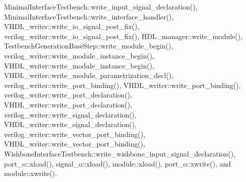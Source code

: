 Minimal\+Interface\+Testbench\+::write\+\_\+input\+\_\+signal\+\_\+declaration(), Minimal\+Interface\+Testbench\+::write\+\_\+interface\+\_\+handler(), V\+H\+D\+L\+\_\+writer\+::write\+\_\+io\+\_\+signal\+\_\+post\+\_\+fix(), verilog\+\_\+writer\+::write\+\_\+io\+\_\+signal\+\_\+post\+\_\+fix(), H\+D\+L\+\_\+manager\+::write\+\_\+module(), Testbench\+Generation\+Base\+Step\+::write\+\_\+module\+\_\+begin(), verilog\+\_\+writer\+::write\+\_\+module\+\_\+instance\+\_\+begin(), V\+H\+D\+L\+\_\+writer\+::write\+\_\+module\+\_\+instance\+\_\+begin(), V\+H\+D\+L\+\_\+writer\+::write\+\_\+module\+\_\+parametrization\+\_\+decl(), verilog\+\_\+writer\+::write\+\_\+port\+\_\+binding(), V\+H\+D\+L\+\_\+writer\+::write\+\_\+port\+\_\+binding(), verilog\+\_\+writer\+::write\+\_\+port\+\_\+declaration(), V\+H\+D\+L\+\_\+writer\+::write\+\_\+port\+\_\+declaration(), verilog\+\_\+writer\+::write\+\_\+signal\+\_\+declaration(), V\+H\+D\+L\+\_\+writer\+::write\+\_\+signal\+\_\+declaration(), verilog\+\_\+writer\+::write\+\_\+vector\+\_\+port\+\_\+binding(), V\+H\+D\+L\+\_\+writer\+::write\+\_\+vector\+\_\+port\+\_\+binding(), Wishbone\+Interface\+Testbench\+::write\+\_\+wishbone\+\_\+input\+\_\+signal\+\_\+declaration(), port\+\_\+o\+::xload(), signal\+\_\+o\+::xload(), module\+::xload(), port\+\_\+o\+::xwrite(), and module\+::xwrite().

